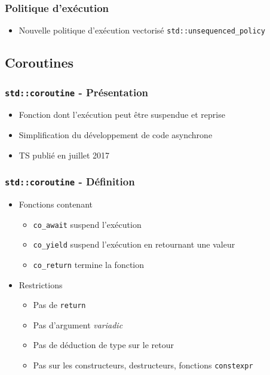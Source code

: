 \documentclass[C++.tex]{subfiles}
\begin{document}
\begin{frame}[fragile]
	\frametitle{Politique d'exécution}
	\begin{itemize}
		\item Nouvelle politique d'exécution vectorisé \lstinline|std::unsequenced_policy|
	\end{itemize}
\end{frame}

\subsection*{Coroutines}
\begin{frame}[fragile]
	\frametitle{\lstinline|std::coroutine| - Présentation}
	\begin{itemize}
		\item Fonction dont l'exécution peut être suspendue et reprise
		\item Simplification du développement de code asynchrone
		\item TS publié en juillet 2017
	\end{itemize}
\end{frame}

\begin{frame}[fragile]
	\frametitle{\lstinline|std::coroutine| - Définition}
	\begin{itemize}
		\item Fonctions contenant
		\begin{itemize}
			\item \lstinline|co_await| suspend l'exécution
			\item \lstinline|co_yield| suspend l'exécution en retournant une valeur
			\item \lstinline|co_return| termine la fonction
		\end{itemize}

		\item Restrictions
		\begin{itemize}
			\item Pas de \lstinline|return|
			\item Pas d'argument \textit{variadic}


			\item Pas de déduction de type sur le retour


			\item Pas sur les constructeurs, destructeurs, fonctions \lstinline|constexpr|
		\end{itemize}
	\end{itemize}
\end{frame}
\end{document}
